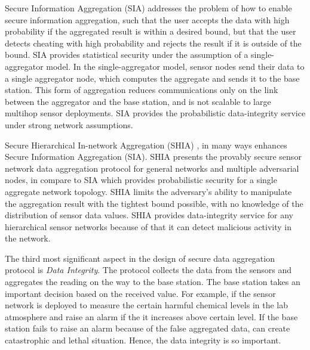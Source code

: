 	Secure Information Aggregation (SIA) \cite{przydatek2003sia}  addresses the problem of how to enable secure information aggregation, such that the user accepts the data with high probability if the aggregated result is within a desired bound, but that the user detects cheating with high probability and rejects the result if it is outside of the bound.
	SIA provides statistical security under the assumption of a single-aggregator model.
	In the single-aggregator model, sensor nodes send their data to a single
	aggregator node, which computes the aggregate and sends it to the
	base station.
	This form of aggregation reduces communications only on the link between the aggregator and the base station, and is not scalable to large multihop sensor deployments.
	SIA provides the probabilistic data-integrity service under strong network assumptions.

	Secure Hierarchical In-network Aggregation (SHIA) \cite{chan2006secure}, in many ways enhances Secure Information Aggregation (SIA).
	SHIA presents the provably secure sensor network data aggregation protocol for general networks and multiple adversarial nodes, in compare to SIA which provides probabilistic security for a single aggregate network topology.
	SHIA limits the adversary’s ability to manipulate the aggregation result with the tightest bound possible, with no knowledge of the distribution of sensor data values.
	SHIA provides data-integrity service for any hierarchical sensor networks because of that it can detect malicious activity in the network.

	The third most significant aspect in the design of secure data aggregation protocol is \textit{Data Integrity}.
	The protocol collects the data from the sensors and aggregates the reading on the way to the base station.
	The base station takes an important decision based on the received value.
	For example, if the sensor network is deployed to measure the certain harmful chemical levels in the lab atmosphere and raise an alarm if the it increases above certain level.
	If the base station fails to raise an alarm because of the false aggregated data, can create catastrophic and lethal situation.
	Hence, the data integrity is so important.

